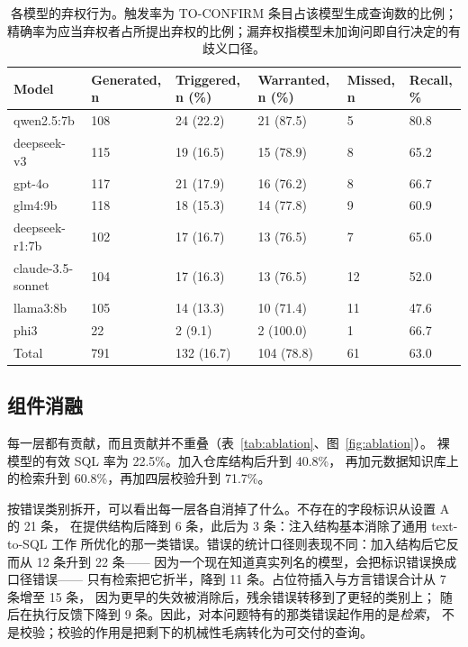 \documentclass[11pt,a4paper]{article}
\begin{document}
\begin{table}[H]
\caption{各模型的弃权行为。触发率为 TO-CONFIRM 条目占该模型生成查询数的比例；精确率为应当弃权者占所提出弃权的比例；漏弃权指模型未加询问即自行决定的有歧义口径。}
\label{tab:abstain}
\centering
\footnotesize
\setlength{\tabcolsep}{5pt}
\begin{tabular*}{\linewidth}{@{\extracolsep{\fill}}llllll@{}}
\toprule
Model & Generated, n & Triggered, n (\%) & Warranted, n (\%) & Missed, n & Recall, \%\\
\midrule
qwen2.5:7b        & 108 & 24 (22.2) & 21 (87.5) & 5  & 80.8\\
deepseek-v3       & 115 & 19 (16.5) & 15 (78.9) & 8  & 65.2\\
gpt-4o            & 117 & 21 (17.9) & 16 (76.2) & 8  & 66.7\\
glm4:9b           & 118 & 18 (15.3) & 14 (77.8) & 9  & 60.9\\
deepseek-r1:7b    & 102 & 17 (16.7) & 13 (76.5) & 7  & 65.0\\
claude-3.5-sonnet & 104 & 17 (16.3) & 13 (76.5) & 12 & 52.0\\
llama3:8b         & 105 & 14 (13.3) & 10 (71.4) & 11 & 47.6\\
phi3              & 22  & 2 (9.1)   & 2 (100.0) & 1  & 66.7\\
\midrule
Total             & 791 & 132 (16.7) & 104 (78.8) & 61 & 63.0\\
\bottomrule
\end{tabular*}
\end{table}

\subsection{组件消融}
每一层都有贡献，而且贡献并不重叠（表~\ref{tab:ablation}、图~\ref{fig:ablation}）。
裸模型的有效 SQL 率为 22.5\%。加入仓库结构后升到 40.8\%，
再加元数据知识库上的检索升到 60.8\%，再加四层校验升到 71.7\%。

按错误类别拆开，可以看出每一层各自消掉了什么。不存在的字段标识从设置 A 的 21 条，
在提供结构后降到 6 条，此后为 3 条：注入结构基本消除了通用 text-to-SQL 工作
所优化的那一类错误。错误的统计口径则表现不同：加入结构后它反而从 12 条升到 22 条——
因为一个现在知道真实列名的模型，会把标识错误换成口径错误——
只有检索把它折半，降到 11 条。占位符插入与方言错误合计从 7 条增至 15 条，
因为更早的失效被消除后，残余错误转移到了更轻的类别上；
随后在执行反馈下降到 9 条。因此，对本问题特有的那类错误起作用的是\emph{检索}，
不是校验；校验的作用是把剩下的机械性毛病转化为可交付的查询。
\end{document}
